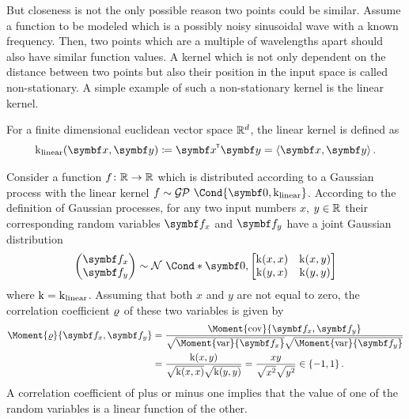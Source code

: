 But closeness is not the only possible reason two points could be similar.
Assume a function to be modeled which is a possibly noisy sinusoidal wave with a known frequency.
Then, two points which are a multiple of wavelengths apart should also have similar function values.
A kernel which is not only dependent on the distance between two points but also their position in the input space is called non-stationary.
A simple example of such a non-stationary kernel is the linear kernel.
\begin{definition}
    For a finite dimensional euclidean vector space $\mathbb{R}^d$, the linear kernel is defined as
    \begin{align}
        \K_{\text{linear}}(\mat{x}, \mat{y}) \coloneqq \mat{x}\tran \mat{y} = \left\langle \mat{x}, \mat{y}\right\rangle.
    \end{align}
\end{definition}
Consider a function $f \colon \mathbb{R} \to \mathbb{R}$ which is distributed according to a Gaussian process with the linear kernel $f \sim \GP\Cond{\mat{0}, \K_{\text{linear}}}$.
According to the definition of Gaussian processes, for any two input numbers $x$, $y \in \mathbb{R}$ their corresponding random variables $\rv{f_x}$ and $\rv{f_y}$ have a joint Gaussian distribution
\begin{align}
    \begin{pmatrix}
        \rv{f_x} \\ \rv{f_y}
    \end{pmatrix} \sim \Gaussian*{\mat{0}, \begin{bmatrix}
            \K(x, x) & \K(x, y) \\
            \K(y, x) & \K(y, y)
        \end{bmatrix}}
\end{align}
where $\operatorname{k} = \operatorname{k}_{\text{linear}}$.
Assuming that both $x$ and $y$ are not equal to zero, the correlation coefficient $\operatorname{\varrho}$ of these two variables is given by
\begin{align}
    \begin{split}
        \Moment{\corr}{\rv{f_x}, \rv{f_y}} &= \frac{\Moment{\cov}{\rv{f_x}, \rv{f_y}}}{\sqrt{\Moment{\var}{\rv{f_x}\vphantom{\rv{f_y}}}}\sqrt{\Moment{\var}{\rv{f_y}}}} \\
        &= \frac{\K(x, y)}{\sqrt{\K(x, x)} \sqrt{\K(y, y)}} = \frac{xy}{\sqrt{\vphantom{y^2}x^2}\sqrt{\vphantom{y^2}y^2}} \in \left\{ -1, 1 \right\}.
    \end{split}
\end{align}
A correlation coefficient of plus or minus one implies that the value of one of the random variables is a linear function of the other.
